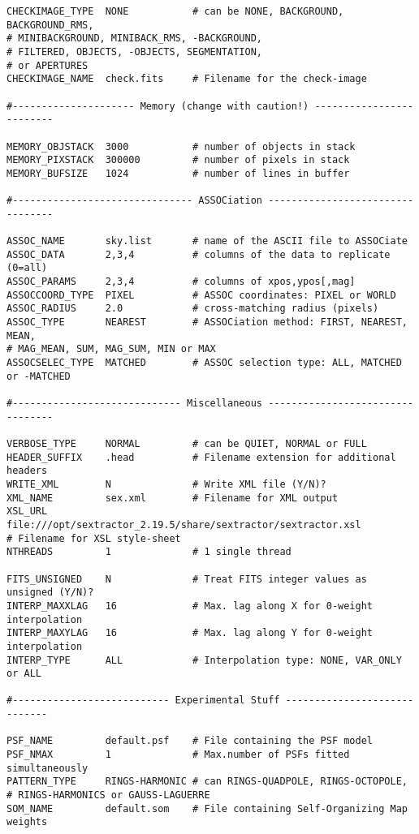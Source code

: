 \documentclass[apj, revtex4]{emulateapj}
\begin{document}
\begin{verbatim}
CHECKIMAGE_TYPE  NONE           # can be NONE, BACKGROUND, BACKGROUND_RMS,
# MINIBACKGROUND, MINIBACK_RMS, -BACKGROUND,
# FILTERED, OBJECTS, -OBJECTS, SEGMENTATION,
# or APERTURES
CHECKIMAGE_NAME  check.fits     # Filename for the check-image

#--------------------- Memory (change with caution!) -------------------------

MEMORY_OBJSTACK  3000           # number of objects in stack
MEMORY_PIXSTACK  300000         # number of pixels in stack
MEMORY_BUFSIZE   1024           # number of lines in buffer

#------------------------------- ASSOCiation ---------------------------------

ASSOC_NAME       sky.list       # name of the ASCII file to ASSOCiate
ASSOC_DATA       2,3,4          # columns of the data to replicate (0=all)
ASSOC_PARAMS     2,3,4          # columns of xpos,ypos[,mag]
ASSOCCOORD_TYPE  PIXEL          # ASSOC coordinates: PIXEL or WORLD
ASSOC_RADIUS     2.0            # cross-matching radius (pixels)
ASSOC_TYPE       NEAREST        # ASSOCiation method: FIRST, NEAREST, MEAN,
# MAG_MEAN, SUM, MAG_SUM, MIN or MAX
ASSOCSELEC_TYPE  MATCHED        # ASSOC selection type: ALL, MATCHED or -MATCHED

#----------------------------- Miscellaneous ---------------------------------

VERBOSE_TYPE     NORMAL         # can be QUIET, NORMAL or FULL
HEADER_SUFFIX    .head          # Filename extension for additional headers
WRITE_XML        N              # Write XML file (Y/N)?
XML_NAME         sex.xml        # Filename for XML output
XSL_URL          file:///opt/sextractor_2.19.5/share/sextractor/sextractor.xsl
# Filename for XSL style-sheet
NTHREADS         1              # 1 single thread

FITS_UNSIGNED    N              # Treat FITS integer values as unsigned (Y/N)?
INTERP_MAXXLAG   16             # Max. lag along X for 0-weight interpolation
INTERP_MAXYLAG   16             # Max. lag along Y for 0-weight interpolation
INTERP_TYPE      ALL            # Interpolation type: NONE, VAR_ONLY or ALL

#--------------------------- Experimental Stuff -----------------------------

PSF_NAME         default.psf    # File containing the PSF model
PSF_NMAX         1              # Max.number of PSFs fitted simultaneously
PATTERN_TYPE     RINGS-HARMONIC # can RINGS-QUADPOLE, RINGS-OCTOPOLE,
# RINGS-HARMONICS or GAUSS-LAGUERRE
SOM_NAME         default.som    # File containing Self-Organizing Map weights
\end{verbatim}
\end{document}
